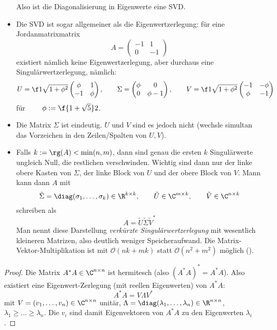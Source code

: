 \documentclass[11pt]{scrbook}
\begin{document}
\begin{st}
\begin{note}
\begin{itemize}
				Also ist die Diagonalisierung in Eigenwerte eine SVD.
			\item
				Die SVD ist sogar allgemeiner als die Eigenwertzerlegung:
				für eine Jordanmatrixmatrix
				\[
					A = \begin{pmatrix}
						-1 & 1 \\
						0 & -1
					\end{pmatrix}
				\]
				existiert nämlich keine Eigenwertzerlegung, aber durchaus eine Singulärwertzerlegung, nämlich:
				\[
					U = \f 1{\sqrt{1+\phi^2}} \begin{pmatrix}
						\phi & 1 \\
						-1 & \phi
					\end{pmatrix}, \qquad
					\Sigma = \begin{pmatrix}
						\phi & 0 \\
						0 & \phi -1
					\end{pmatrix}, \qquad 
					V = \f 1{\sqrt{1+\phi^2}} \begin{pmatrix}
						-1 & -\phi \\
						\phi & - 1
					\end{pmatrix}
				\]
				für $\qquad \phi := \f {1+\sqrt 5}2$.
			\item
				Die Matrix $\Sigma$ ist eindeutig. 
				$U$ und $V$ sind es jedoch nicht (wechsle simultan das Vorzeichen in den Zeilen/Spalten von $U,V$).
			\item
				Falls $k := \rg(A) < \min(n,m)$, dann sind genau die ersten $k$ Singulärwerte ungleich Null, die restlichen verschwinden.
				Wichtig sind dann nur der linke obere Kasten von $\Sigma$, der linke Block von $U$ und der obere Block von $V$.
				Mann kann dann $A$ mit
				\[
					\tilde \Sigma = \diag(\sigma_1,\dotsc,\sigma_k) \in \R^{k\times k}
					, \qquad 
					\tilde U \in \C^{m\times k}
					, \qquad 
					\tilde V \in \C^{n\times k}
				\]
				schreiben als
				\[
					A = \tilde U \tilde \Sigma \tilde V^*
				\]
				Man nennt diese Darstellung \emph{verkürzte Singulärwertzerlegung} mit wesentlich kleineren Matrizen, also deutlich weniger Speicheraufwand.
				Die Matrix-Vektor-Multiplikation ist mit $\mathcal O(nk+mk)$ statt $\mathcal O(n^2 + m^2)$ möglich ().
		\end{itemize}
	\end{note}
	\begin{proof}
		Die Matrix $A^*A \in \C^{n\times n}$ ist hermitesch (also $(A^*A)^*=A^*A$).
		Also existiert eine Eigenwert-Zerlegung (mit reellen Eigenwerten) von $A^*A$:
		\[
			A^*A = V\Lambda V^*
		\]
		mit $V=(v_1,\dotsc, v_n)\in \C^{n\times n}$ unitär, $\Lambda = \diag(\lambda_1,\dotsc,\lambda_n) \in \R^{n\times n}$, $\lambda_1\ge \dotsc \ge \lambda_n$.
		Die $v_i$ sind damit Eigenvektoren von $A^*A$ zu den Eigenwerten $\lambda_i$.


\end{proof}
\end{st}
\end{document}
